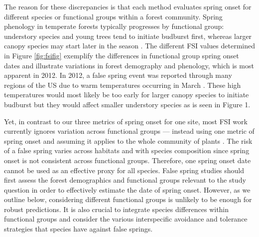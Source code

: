 \documentclass{article}\usepackage[]{graphicx}\usepackage[]{color}
\begin{document}
The reason for these discrepancies is that each method evaluates spring onset for different species or functional groups within a forest community. Spring phenology in temperate forests typically progresses by functional group: understory species and young trees tend to initiate budburst first, whereas larger canopy species may start later in the season \citep{Richardson2009, Xin2016}. The different FSI values determined in Figure \ref{fig:fsifig} exemplify the differences in functional group spring onset dates and illustrate variations in forest demography and phenology, which is most apparent in 2012. In 2012, a false spring event was reported through many regions of the US due to warm temperatures occurring in March \citep{Ault2015}. These high temperatures would most likely be too early for larger canopy species to initiate budburst but they would affect smaller understory species as is seen in Figure 1. 

Yet, in contrast to our three metrics of spring onset for one site, most FSI work currently ignores variation across functional groups --- instead using one metric of spring onset and assuming it applies to the whole community of plants \citep{Marino2011, Peterson2014, Allstadt2015, Mehdipoor2017}. The risk of a false spring varies across habitats and with species composition since spring onset is not consistent across functional groups. Therefore, one spring onset date cannot be used as an effective proxy for all species. False spring studies should first assess the forest demographics and functional groups relevant to the study question in order to effectively estimate the date of spring onset. However, as we outline below, considering different functional groups is unlikely to be enough for robust predictions. It is also crucial to integrate species differences within functional groups and consider the various interspecific avoidance and tolerance strategies that species have against false springs. %
\end{document}
